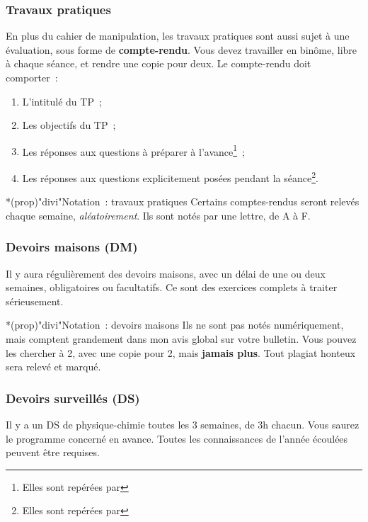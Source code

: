 \documentclass[10pt, garamond]{book}
\begin{document}
\subsubsection{Travaux pratiques}
En plus du cahier de manipulation, les travaux pratiques sont aussi sujet à une
évaluation, sous forme de \textbf{compte-rendu}. Vous devez travailler en
binôme, libre à chaque séance, et rendre une copie pour deux. Le compte-rendu
doit comporter~:
\begin{enumerate}
	\item L'intitulé du TP~;
	\item Les objectifs du TP~;
	\item Les réponses aux questions à préparer à l'avance\footnote{Elles sont
		      repérées par }~;
	\item Les réponses aux questions explicitement posées pendant la
	      séance\footnote{Elles sont repérées par }.
\end{enumerate}

\begin{tcb}*(prop)"divi"{Notation~: travaux pratiques}
	Certains comptes-rendus seront relevés chaque semaine, \textit{aléatoirement}.
	Ils sont notés par une lettre, de A à F.
\end{tcb}

\subsubsection{Devoirs maisons (DM)}
Il y aura régulièrement des devoirs maisons, avec un délai de une ou deux
semaines, obligatoires ou facultatifs. Ce sont des exercices complets à traiter
sérieusement.

\begin{tcb}*(prop)"divi"{Notation~: devoirs maisons}
	Ils ne sont pas notés numériquement, mais comptent grandement dans mon avis
	global sur votre bulletin. Vous pouvez les chercher à 2, avec une copie pour
	2, mais \textbf{jamais plus}. Tout plagiat honteux sera relevé et marqué.
\end{tcb}

\subsubsection{Devoirs surveillés (DS)}
Il y a un DS de physique-chimie toutes les 3 semaines, de 3h chacun. Vous saurez
le programme concerné en avance. Toutes les connaissances de l'année écoulées
peuvent être requises.
\end{document}
